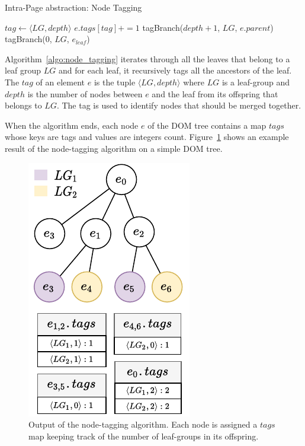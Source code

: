 \begin{algorithm}
\caption{Intra-Page abstraction: Node Tagging}\label{alg:intra_tagging}
\begin{algorithmic}[1]
      \State $tag \gets \langle LG, depth \rangle$
      \State $e.tags[tag] += 1$ 
      \State tagBranch($depth + 1$, $LG$, $e.parent$)
    \EndFunction
        \State tagBranch(0, $LG$, $e_{leaf}$) 
      \EndFor
    \EndFor
  \EndFunction
\end{algorithmic}
\label{algo:node_tagging}
\end{algorithm}

Algorithm~\ref{algo:node_tagging} iterates through all the leaves that belong to a leaf group $LG$ and for each leaf, it recursively tags all the ancestors of the leaf. 
The $tag$ of an element $e$ is the tuple $\langle LG, depth \rangle$ where $LG$ is a leaf-group and $depth$ is the number of nodes between $e$ and the leaf from its offspring that belongs to $LG$.
The tag is used to identify nodes that should be merged together.

When the algorithm ends, each node $e$ of the DOM tree contains a map $tags$ whose keys are tags and values are integers count. 
Figure~\ref{fig:node_tagging} shows an example result of the node-tagging algorithm on a simple DOM tree. 

\begin{figure}[ht]
  \centering
  \includegraphics[width=0.5\linewidth]{appstract/explanations/node-tagging}
  \caption{Output of the node-tagging algorithm. Each node is assigned a $tags$ map keeping track of the number of leaf-groups in its offspring.}
  \label{fig:node_tagging}
\end{figure}

